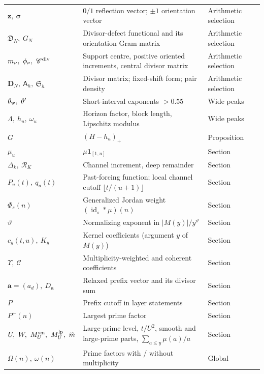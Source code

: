 \documentclass[11pt,reqno]{amsart}
\makeatletter
\let\CG@origref\ref
\newcommand{\CG@gettip}[1]{\@ifundefined{CGTip@#1}{Reference: #1}{\csname CGTip@#1\endcsname}}
\DeclareRobustCommand{\CGref}[1]{\pdftooltip{\CG@origref{#1}}{\CG@gettip{#1}}}
\numberwithin{equation}{section}
\theoremstyle{plain}
\theoremstyle{definition}
\theoremstyle{remark}
\newcommand{\Pp}{P^{+}}
\newcommand{\Cc}{\mathcal{C}}
\newcommand{\mt}{\widetilde{m}}
\makeatother
\begin{document}
\begin{longtable}{@{}p{}p{}p{}@{}}
$\mathbf z,\ \boldsymbol\sigma$ & $0/1$ reflection vector; $\pm1$ orientation vector & Arithmetic selection\\
$\mathfrak D_N,\ G_N$ & Divisor-defect functional and its orientation Gram matrix & Arithmetic selection\\
$m_\nu,\ \phi_\nu,\ \mathscr C^{\rm div}$ & Support centre, positive oriented increments, central divisor matrix & Arithmetic selection\\
$\mathbf D_N,\ \mathsf A_h,\ \mathfrak S_h$ & Divisor matrix; fixed-shift form; pair density & Arithmetic selection\\
$\theta_{\rm w},\ \theta'$ & Short-interval exponents $>0.55$ & Wide peaks\\
$\Lambda,\ h_u,\ \omega_u$ & Horizon factor, block length, Lipschitz modulus & Wide peaks\\
$G$ & $(H-h_u)_+$ & Proposition~\CGref{prop:wide-peaks}\\
$\mu_u$ & $\mu\mathbf 1_{[1,u]}$ & Section~\CGref{sec:prefix}\\
$\Delta_k,\ \mathcal R_K$ & Channel increment, deep remainder & Section~\CGref{sec:prefix}\\
$P_u(t),\ q_u(t)$ & Past-forcing function; local channel cutoff $\lfloor t/(u+1)\rfloor$ & Section~\CGref{sec:prefix}\\
$\Phi_s(n)$ & Generalized Jordan weight $(\operatorname{id}_s*\mu)(n)$ & Section~\CGref{sec:prefix}\\
$\vartheta$ & Normalizing exponent in $|M(y)|/y^\vartheta$ & Section~\CGref{sec:prefix}\\
$c_y(t,u),\ K_y$ & Kernel coefficients (argument $y$ of $M(y)$) & Section~\CGref{sec:prefix}\\
$\Upsilon,\ \Cc$ & Multiplicity-weighted and coherent coefficients & Section~\CGref{sec:prefix}\\
$\mathbf a=(a_d),\ D_{\mathbf a}$ & Relaxed prefix vector and its divisor sum & Section~\CGref{sec:prefix}\\
$P$ & Prefix cutoff in layer statements & Section~\CGref{sec:prefix}\\
$\Pp(n)$ & Largest prime factor & Section~\CGref{sec:prefix}\\
$U,\ W,\ M^{\rm sm}_U,\ M^{\rm lp}_U,\ \mt$ & Large-prime level, $t/U^2$, smooth and large-prime parts, $\sum_{a\le y}\mu(a)/a$ & Section~\CGref{sec:prefix}\\
$\Omega(n),\ \omega(n)$ & Prime factors with / without multiplicity & Global\\

\end{longtable}
\end{document}

